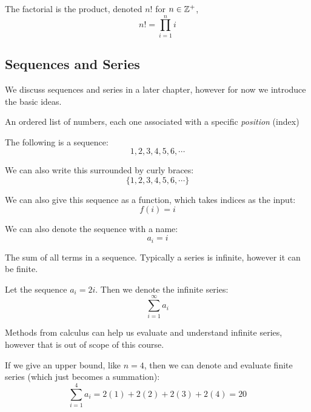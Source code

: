 \documentclass[main.tex]{subfiles}
\begin{document}

\begin{defn}
	The factorial is the product, denoted \(n!\) for \(n \in \mathbb{Z}^+\), \[n! = \prod_{i=1}^{n} i\]
\end{defn}

\subsection{Sequences and Series}

We discuss sequences and series in a later chapter, however for now we introduce the basic ideas.

\begin{defn}
	An ordered list of numbers, each one associated with a specific \textit{position} (index)
\end{defn}

\begin{example}
	The following is a sequence: \[1,2,3,4,5,6,\cdots\]
	
	We can also write this surrounded by curly braces: \[\{1,2,3,4,5,6,\cdots\}\]
	
	We can also give this sequence as a function, which takes indices as the input: \[f(i) = i\]
	
	We can also denote the sequence with a name: \[a_i = i\]
\end{example}

\begin{defn}
	The sum of all terms in a sequence. Typically a series is infinite, however it can be finite.
\end{defn}

\begin{example}
	Let the sequence \(a_i = 2i\). Then we denote the infinite series: \[\sum_{i=1}^{\infty} a_i\]
	
	Methods from calculus can help us evaluate and understand infinite series, however that is out of scope of this course.
	
	If we give an upper bound, like \(n = 4\), then we can denote and evaluate finite series (which just becomes a summation): \[\sum_{i=1}^{4} a_i = 2(1) + 2(2) + 2(3) + 2(4) = 20\]
\end{example}
\end{document}
